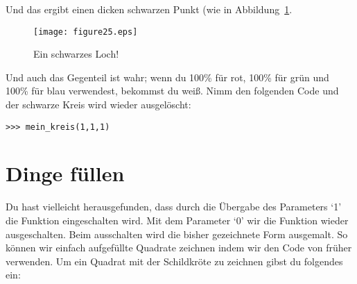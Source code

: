 Und das ergibt einen dicken schwarzen Punkt (wie in Abbildung~\ref{fig25}.

\begin{figure}
\begin{center}
\texttt{[image: figure25.eps]}
\end{center}
\caption{Ein schwarzes Loch!}\label{fig25}
\end{figure}

Und auch das Gegenteil ist wahr; wenn du 100\% für rot, 100\% für grün und 100\% für blau verwendest, bekommst du weiß. Nimm den folgenden Code und der schwarze Kreis wird wieder ausgelöscht:

\begin{Verbatim}[frame=single]
>>> mein_kreis(1,1,1)
\end{Verbatim}

\section{Dinge füllen}

Du hast vielleicht herausgefunden, dass durch die Übergabe des Parameters `1' die  Funktion eingeschalten wird. Mit dem Parameter `0' wir die Funktion wieder ausgeschalten. Beim ausschalten wird die bisher gezeichnete Form ausgemalt. So können wir einfach aufgefüllte Quadrate zeichnen indem wir den Code von früher verwenden. Um ein Quadrat mit der Schildkröte zu zeichnen gibst du folgendes ein:

